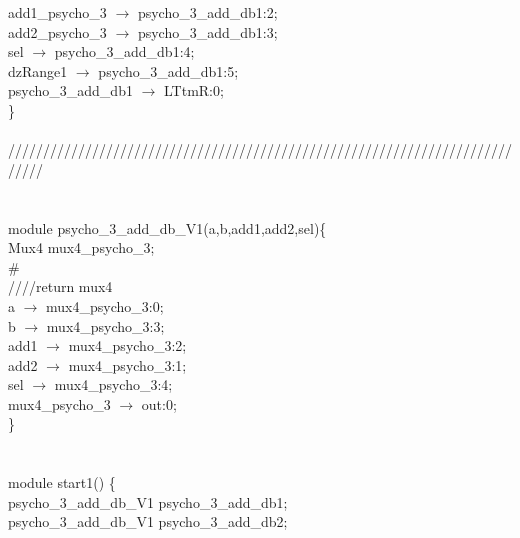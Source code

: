    \hspace*{2em}add1\_psycho\_3 $\rightarrow$ psycho\_3\_add\_db1:2; \\
   \hspace*{2em}add2\_psycho\_3 $\rightarrow$ psycho\_3\_add\_db1:3; \\
   \hspace*{2em}sel $\rightarrow$ psycho\_3\_add\_db1:4; \\
   \hspace*{2em}dzRange1 $\rightarrow$ psycho\_3\_add\_db1:5; \\
   \hspace*{2em}psycho\_3\_add\_db1 $\rightarrow$ LTtmR:0; \\
\} \\
\\
///////////////////////////////////////////////////////////////////////////// \\
\\
\\
module psycho\_3\_add\_db\_V1(a,b,add1,add2,sel)\{ \\
\hspace*{2em}Mux4 mux4\_psycho\_3; \\
\# \\
\hspace*{2em}////return mux4 \\
\hspace*{2em}a $\rightarrow$ mux4\_psycho\_3:0; \\
\hspace*{2em}b $\rightarrow$ mux4\_psycho\_3:3; \\
\hspace*{2em}add1 $\rightarrow$ mux4\_psycho\_3:2; \\
\hspace*{2em}add2 $\rightarrow$ mux4\_psycho\_3:1; \\
\hspace*{2em}sel $\rightarrow$ mux4\_psycho\_3:4; \\
\hspace*{2em}mux4\_psycho\_3 $\rightarrow$ out:0; \\
\} \\
\\
\\
module start1() \{ \\
\hspace*{2em}psycho\_3\_add\_db\_V1 psycho\_3\_add\_db1; \\
\hspace*{2em}psycho\_3\_add\_db\_V1 psycho\_3\_add\_db2; \\

